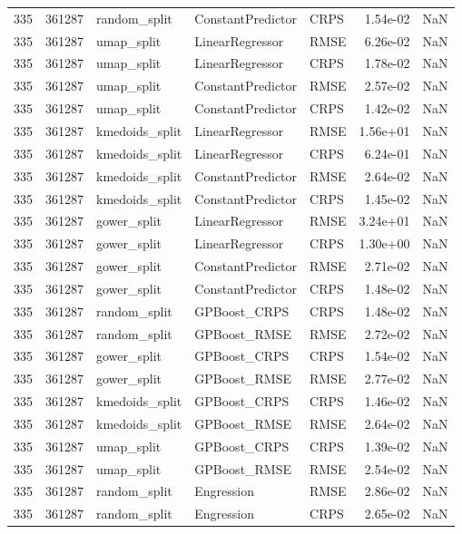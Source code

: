 \begin{tabular}{rrlllrr}
335 & 361287 & random\_split & ConstantPredictor & CRPS & 1.54e-02 & NaN \\
335 & 361287 & umap\_split & LinearRegressor & RMSE & 6.26e-02 & NaN \\
335 & 361287 & umap\_split & LinearRegressor & CRPS & 1.78e-02 & NaN \\
335 & 361287 & umap\_split & ConstantPredictor & RMSE & 2.57e-02 & NaN \\
335 & 361287 & umap\_split & ConstantPredictor & CRPS & 1.42e-02 & NaN \\
335 & 361287 & kmedoids\_split & LinearRegressor & RMSE & 1.56e+01 & NaN \\
335 & 361287 & kmedoids\_split & LinearRegressor & CRPS & 6.24e-01 & NaN \\
335 & 361287 & kmedoids\_split & ConstantPredictor & RMSE & 2.64e-02 & NaN \\
335 & 361287 & kmedoids\_split & ConstantPredictor & CRPS & 1.45e-02 & NaN \\
335 & 361287 & gower\_split & LinearRegressor & RMSE & 3.24e+01 & NaN \\
335 & 361287 & gower\_split & LinearRegressor & CRPS & 1.30e+00 & NaN \\
335 & 361287 & gower\_split & ConstantPredictor & RMSE & 2.71e-02 & NaN \\
335 & 361287 & gower\_split & ConstantPredictor & CRPS & 1.48e-02 & NaN \\
335 & 361287 & random\_split & GPBoost\_CRPS & CRPS & 1.48e-02 & NaN \\
335 & 361287 & random\_split & GPBoost\_RMSE & RMSE & 2.72e-02 & NaN \\
335 & 361287 & gower\_split & GPBoost\_CRPS & CRPS & 1.54e-02 & NaN \\
335 & 361287 & gower\_split & GPBoost\_RMSE & RMSE & 2.77e-02 & NaN \\
335 & 361287 & kmedoids\_split & GPBoost\_CRPS & CRPS & 1.46e-02 & NaN \\
335 & 361287 & kmedoids\_split & GPBoost\_RMSE & RMSE & 2.64e-02 & NaN \\
335 & 361287 & umap\_split & GPBoost\_CRPS & CRPS & 1.39e-02 & NaN \\
335 & 361287 & umap\_split & GPBoost\_RMSE & RMSE & 2.54e-02 & NaN \\
335 & 361287 & random\_split & Engression & RMSE & 2.86e-02 & NaN \\
335 & 361287 & random\_split & Engression & CRPS & 2.65e-02 & NaN \\

\end{tabular}
